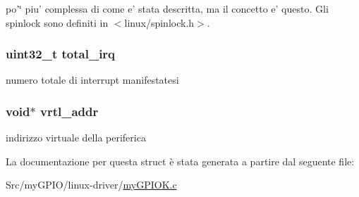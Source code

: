 po'\char`\"{} piu' complessa di come e' stata descritta, ma il concetto e' questo. Gli spinlock sono definiti in $<$linux/spinlock.\+h$>$. \hypertarget{structmy_g_p_i_o_k__t_a2da711ac290a9613b8d8af97f122b997}{
\subsubsection[{total\+\_\+irq}]{\setlength{\rightskip}{0pt plus 5cm}uint32\+\_\+t total\+\_\+irq}}\label{structmy_g_p_i_o_k__t_a2da711ac290a9613b8d8af97f122b997}
numero totale di interrupt manifestatesi \hypertarget{structmy_g_p_i_o_k__t_af5aef493b3c2bc9d1f036ce0acea9bba}{
\subsubsection[{vrtl\+\_\+addr}]{\setlength{\rightskip}{0pt plus 5cm}void$\ast$ vrtl\+\_\+addr}}\label{structmy_g_p_i_o_k__t_af5aef493b3c2bc9d1f036ce0acea9bba}
indirizzo virtuale della periferica 

La documentazione per questa struct è stata generata a partire dal seguente file\+:\begin{DoxyCompactItemize}
\item 
Src/my\+G\+P\+I\+O/linux-\/driver/\hyperlink{my_g_p_i_o_k_8c}{my\+G\+P\+I\+O\+K.\+c}\end{DoxyCompactItemize}
